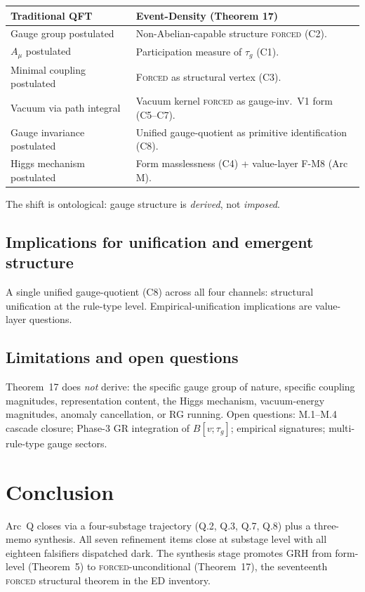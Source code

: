 \documentclass[11pt,a4paper]{article}
\begin{document}
\begin{center}
\begin{tabular}{ll}
\toprule
\textbf{Traditional QFT} & \textbf{Event-Density (Theorem 17)} \\
\midrule
Gauge group postulated & Non-Abelian-capable structure \textsc{forced} (C2). \\
$A_\mu$ postulated & Participation measure of $\tau_g$ (C1). \\
Minimal coupling postulated & \textsc{Forced} as structural vertex (C3). \\
Vacuum via path integral & Vacuum kernel \textsc{forced} as gauge-inv.\ V1 form (C5--C7). \\
Gauge invariance postulated & Unified gauge-quotient as primitive identification (C8). \\
Higgs mechanism postulated & Form masslessness (C4) + value-layer F-M8 (Arc M). \\
\bottomrule
\end{tabular}
\end{center}

The shift is ontological: gauge structure is \emph{derived}, not \emph{imposed}.

\subsection{Implications for unification and emergent structure}
A single unified gauge-quotient (C8) across all four channels: structural unification at the rule-type level. Empirical-unification implications are value-layer questions.

\subsection{Limitations and open questions}
Theorem~17 does \emph{not} derive: the specific gauge group of nature, specific coupling magnitudes, representation content, the Higgs mechanism, vacuum-energy magnitudes, anomaly cancellation, or RG running. Open questions: M.1--M.4 cascade closure; Phase-3 GR integration of $B[v;\tau_g]$; empirical signatures; multi-rule-type gauge sectors.

\section{Conclusion}

Arc~Q closes via a four-substage trajectory (Q.2, Q.3, Q.7, Q.8) plus a three-memo synthesis. All seven refinement items close at substage level with all eighteen falsifiers dispatched dark. The synthesis stage promotes GRH from form-level (Theorem~5) to \textsc{forced}-unconditional (Theorem~17), the seventeenth \textsc{forced} structural theorem in the ED inventory.
\end{document}
